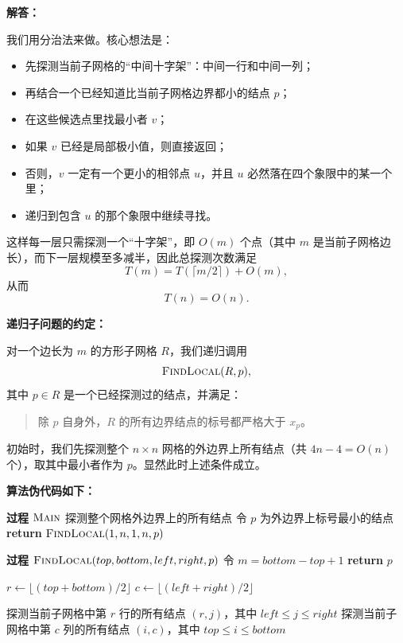 ﻿\documentclass[12pt,a4paper]{article}
\begin{document}
\begin{answerbox}
\textbf{解答：}

我们用分治法来做。核心想法是：

\begin{itemize}
    \item 先探测当前子网格的“中间十字架”：中间一行和中间一列；
    \item 再结合一个已经知道比当前子网格边界都小的结点 $p$；
    \item 在这些候选点里找最小者 $v$；
    \item 如果 $v$ 已经是局部极小值，则直接返回；
    \item 否则，$v$ 一定有一个更小的相邻点 $u$，并且 $u$ 必然落在四个象限中的某一个里；
    \item 递归到包含 $u$ 的那个象限中继续寻找。
\end{itemize}

这样每一层只需探测一个“十字架”，即 $O(m)$ 个点（其中 $m$ 是当前子网格边长），而下一层规模至多减半，因此总探测次数满足
\[
T(m)=T(\lceil m/2\rceil)+O(m),
\]
从而
\[
T(n)=O(n).
\]

\medskip
\textbf{递归子问题的约定：}

对一个边长为 $m$ 的方形子网格 $R$，我们递归调用
\[
\textsc{FindLocal}(R,p),
\]
其中 $p\in R$ 是一个已经探测过的结点，并满足：

\begin{quote}
除 $p$ 自身外，$R$ 的所有边界结点的标号都严格大于 $x_p$。
\end{quote}

初始时，我们先探测整个 $n\times n$ 网格的外边界上所有结点（共 $4n-4=O(n)$ 个），取其中最小者作为 $p$。显然此时上述条件成立。

\medskip
\textbf{算法伪代码如下：}

\begin{algorithm}[H]
\caption{在 $n\times n$ 网格图中寻找局部极小值}
\label{alg:grid-local-min}
\begin{algorithmic}[1]
\STATE \textbf{过程} $\textsc{Main}$
\STATE 探测整个网格外边界上的所有结点
\STATE 令 $p$ 为外边界上标号最小的结点
\STATE \textbf{return} $\textsc{FindLocal}(1,n,1,n,p)$

\medskip
\STATE \textbf{过程} $\textsc{FindLocal}(top,bottom,left,right,p)$
\STATE 令 $m = bottom-top+1$
    \STATE \textbf{return} $p$
\ENDIF

\STATE $r \leftarrow \lfloor (top+bottom)/2 \rfloor$
\STATE $c \leftarrow \lfloor (left+right)/2 \rfloor$

\STATE 探测当前子网格中第 $r$ 行的所有结点 $(r,j)$，其中 $left \le j \le right$
\STATE 探测当前子网格中第 $c$ 列的所有结点 $(i,c)$，其中 $top \le i \le bottom$


\end{algorithmic}
\end{algorithm}
\end{answerbox}
\end{document}
